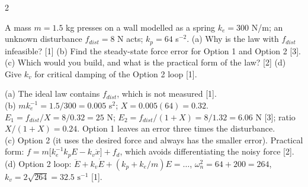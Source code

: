 \begin{multicols}{2}
\begin{examq}
A mass $m=1.5$ kg presses on a wall modelled as a spring $k_e=300$ N/m; an unknown disturbance $f_{dist}=8$ N acts; $k_p=64$ s$^{-2}$. (a) Why is the law with $f_{dist}$ infeasible? [1] (b) Find the steady-state force error for Option 1 and Option 2 [3]. (c) Which would you build, and what is the practical form of the law? [2] (d) Give $k_v$ for critical damping of the Option 2 loop [1].
\end{examq}
\begin{examq}[EQ4: solution]
\solution
(a) The ideal law contains $f_{dist}$, which is not measured [1].\\
(b) $mk_e^{-1}=1.5/300=0.005$ s$^2$; $X=0.005(64)=0.32$. $E_1=f_{dist}/X=8/0.32=\boxed{25\text{ N}}$; $E_2=f_{dist}/(1+X)=8/1.32=\boxed{6.06\text{ N}}$ [3]; ratio $X/(1+X)=0.24$. Option 1 leaves an error three times the disturbance.\\
(c) Option 2 (it uses the desired force and always has the smaller error). Practical form: $f=m\big[k_e^{-1}k_pE-k_v\dot x\big]+f_d$, which avoids differentiating the noisy force [2].\\
(d) Option 2 loop: $\ddot E+k_v\dot E+(k_p+k_e/m)E=\dots$, $\omega_n^2=64+200=264$, $k_v=2\sqrt{264}=\boxed{32.5\text{ s}^{-1}}$ [1]. \chk
\end{examq}


\end{multicols}
